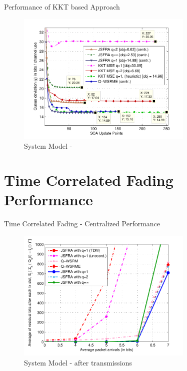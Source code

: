 \documentclass[9pt]{beamer}
\begin{document}
\begin{frame}{Performance of KKT based Approach}
	\begin{figure}
		\centering
		\includegraphics[width=0.75\textwidth]{fig-9-3}
		\caption{System Model - }
	\end{figure}
\end{frame}

\section{Time Correlated Fading Performance}

\begin{frame}{Time Correlated Fading - Centralized Performance}
	\begin{figure}
		\centering
		\includegraphics[width=0.75\textwidth]{average_queue_over_time-3}
		\caption{System Model -  after  transmissions}
	\end{figure}
\end{frame}
\end{document}
